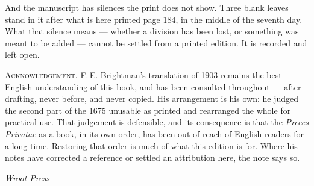 And the manuscript has silences the print does not show. Three blank leaves stand
in it after what is here printed page 184, in the middle of the seventh day. What
that silence means --- whether a division has been lost, or something was meant to
be added --- cannot be settled from a printed edition. It is recorded and left
open.

\vspace{0.8\baselineskip}
{\scshape Acknowledgement.}\quad
F.\,E. Brightman's translation of 1903 remains the best English understanding of
this book, and has been consulted throughout --- after drafting, never before, and
never copied. His arrangement is his own: he judged the second part of the 1675
unusable as printed and rearranged the whole for practical use. That judgement is
defensible, and its consequence is that the \emph{Preces Privatae} as a book, in
its own order, has been out of reach of English readers for a long time. Restoring
that order is much of what this edition is for. Where his notes have corrected a
reference or settled an attribution here, the note says so.

\vspace{1.2\baselineskip}
{\raggedleft\itshape Wroot Press\par}
\endgroup
\clearpage
